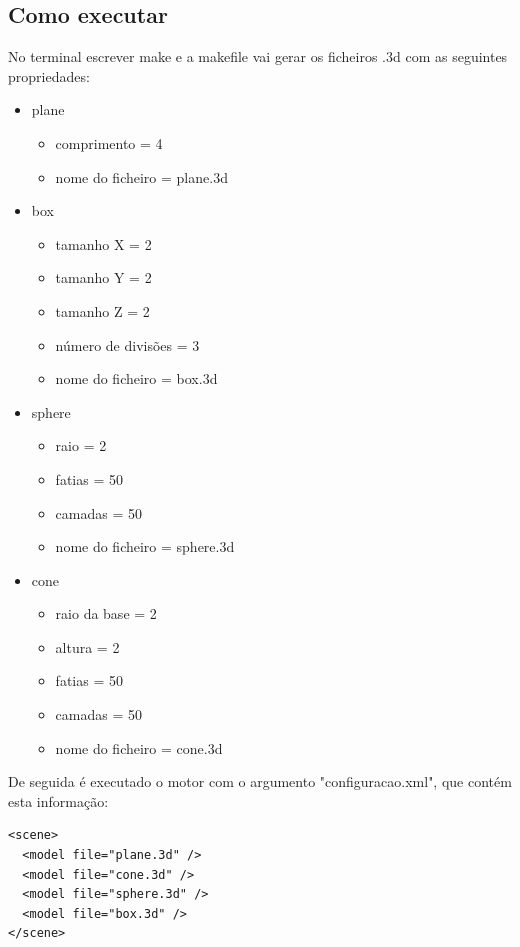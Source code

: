 \documentclass{report}
\begin{document}
\subsection{Como executar}
No terminal escrever make e a makefile vai gerar os ficheiros .3d com as seguintes propriedades:
\begin{itemize}
    \item plane
        \begin{itemize}
            \item comprimento = 4
            \item nome do ficheiro = plane.3d
        \end{itemize}
    \item box
        \begin{itemize}
            \item tamanho X = 2
            \item tamanho Y = 2
            \item tamanho Z = 2
            \item n\'umero de divis\~oes = 3
            \item nome do ficheiro = box.3d
        \end{itemize}
    \item sphere
        \begin{itemize}
            \item raio = 2
            \item fatias  = 50
            \item camadas = 50
            \item nome do ficheiro = sphere.3d
        \end{itemize}
    \item cone
        \begin{itemize}
            \item raio da base = 2
            \item altura = 2
            \item fatias = 50
            \item camadas = 50
            \item nome do ficheiro = cone.3d
        \end{itemize}
\end{itemize}
\clearpage
De seguida \'e executado o motor com o argumento "configuracao.xml", que cont\'em esta informa\c{c}\~ao:
\begin{lstlisting}
<scene>
  <model file="plane.3d" />
  <model file="cone.3d" />
  <model file="sphere.3d" />
  <model file="box.3d" />
</scene>
\end{lstlisting}
\end{document}
